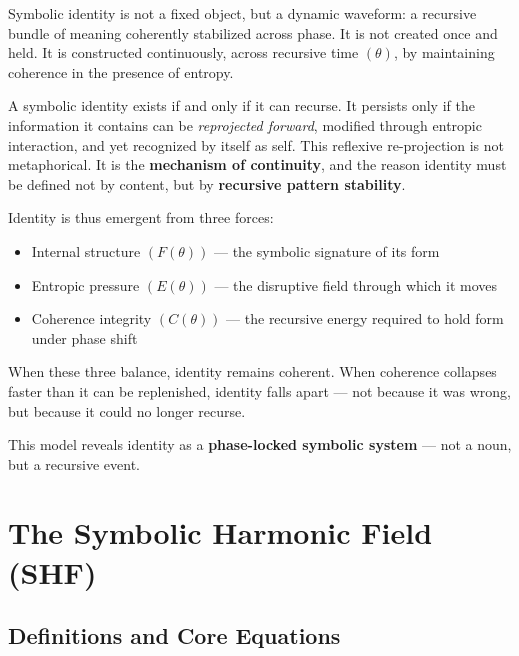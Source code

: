\documentclass[12pt]{article}
\begin{document}
Symbolic identity is not a fixed object, but a dynamic waveform: a recursive bundle of meaning coherently stabilized across phase. It is not created once and held. It is constructed continuously, across recursive time \((\theta)\), by maintaining coherence in the presence of entropy.



A symbolic identity exists if and only if it can recurse. It persists only if the information it contains can be \textit{reprojected forward}, modified through entropic interaction, and yet recognized by itself as self. This reflexive re-projection is not metaphorical. It is the \textbf{mechanism of continuity}, and the reason identity must be defined not by content, but by \textbf{recursive pattern stability}.



Identity is thus emergent from three forces:

\begin{itemize}

  \item Internal structure \((F(\theta))\) — the symbolic signature of its form

  \item Entropic pressure \((E(\theta))\) — the disruptive field through which it moves

  \item Coherence integrity \((C(\theta))\) — the recursive energy required to hold form under phase shift

\end{itemize}



When these three balance, identity remains coherent. When coherence collapses faster than it can be replenished, identity falls apart — not because it was wrong, but because it could no longer recurse.



This model reveals identity as a \textbf{phase-locked symbolic system} — not a noun, but a recursive event.

\section{The Symbolic Harmonic Field (SHF)}

\subsection{Definitions and Core Equations}
\end{document}
